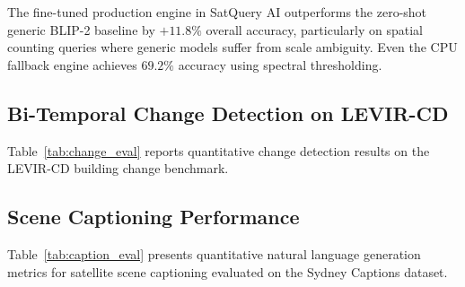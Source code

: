 \documentclass[12pt,a4paper]{report}
\begin{document}
The fine-tuned production engine in SatQuery AI outperforms the zero-shot generic BLIP-2 baseline by $+11.8\%$ overall accuracy, particularly on spatial counting queries where generic models suffer from scale ambiguity. Even the CPU fallback engine achieves $69.2\%$ accuracy using spectral thresholding.

\subsection{Bi-Temporal Change Detection on LEVIR-CD}
Table~\ref{tab:change_eval} reports quantitative change detection results on the LEVIR-CD building change benchmark.

\begin{table}[htbp]
\centering
\caption{Change Detection Performance on the LEVIR-CD Benchmark}\label{tab:change_eval}
\end{table}

\subsection{Scene Captioning Performance}
Table~\ref{tab:caption_eval} presents quantitative natural language generation metrics for satellite scene captioning evaluated on the Sydney Captions dataset.

\begin{table}[htbp]
\centering
\caption{Scene Captioning Performance Comparison}\label{tab:caption_eval}
\end{table}
\end{document}
